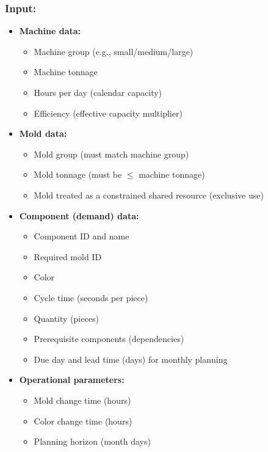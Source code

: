\subsubsection*{Input:}
\begin{itemize}
    \item \textbf{Machine data:}
    \begin{itemize}
        \item Machine group (e.g., small/medium/large)
        \item Machine tonnage
        \item Hours per day (calendar capacity)
        \item Efficiency (effective capacity multiplier)
    \end{itemize}

    \item \textbf{Mold data:}
    \begin{itemize}
        \item Mold group (must match machine group)
        \item Mold tonnage (must be $\le$ machine tonnage)
        \item Mold treated as a constrained shared resource (exclusive use)
    \end{itemize}

    \item \textbf{Component (demand) data:}
    \begin{itemize}
        \item Component ID and name
        \item Required mold ID
        \item Color
        \item Cycle time (seconds per piece)
        \item Quantity (pieces)
        \item Prerequisite components (dependencies)
        \item Due day and lead time (days) for monthly planning
    \end{itemize}

    \item \textbf{Operational parameters:}
    \begin{itemize}
        \item Mold change time (hours)
        \item Color change time (hours)
        \item Planning horizon (month days)
    \end{itemize}
\end{itemize}

